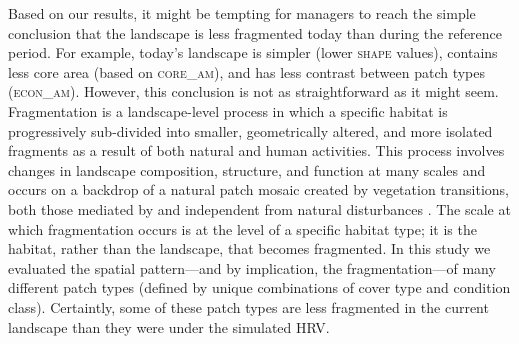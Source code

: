 


Based on our results, it might be tempting for managers to reach the simple conclusion that the landscape is less fragmented today than during the reference period. For example, today's landscape is simpler (lower \textsc{shape} values), contains less core area (based on \textsc{core\_am}), and has less contrast between patch types (\textsc{econ\_am}). However, this conclusion is not as straightforward as it might seem. Fragmentation is a landscape-level process in which a specific habitat is progressively sub-divided into smaller, geometrically altered, and more isolated fragments as a result of both natural and human activities. This process involves changes in landscape composition, structure, and function at many scales and occurs on a backdrop of a natural patch mosaic created by vegetation transitions, both those mediated by and independent from natural disturbances \citep{McGarigal1995}. The scale at which fragmentation occurs is at the level of a specific habitat type; it is the habitat, rather than the landscape, that becomes fragmented. In this study we evaluated the spatial pattern---and by implication, the fragmentation---of many different patch types (defined by unique combinations of cover type and condition class). Certaintly, some of these patch types are less fragmented in the current landscape than they were under the simulated HRV. 

